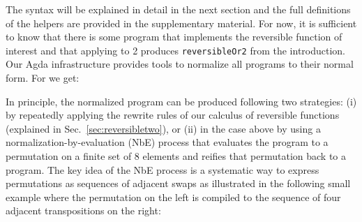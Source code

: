 \resettwo{}

\noindent The syntax will be explained in detail in the next section and the full definitions of the helpers are
provided in the supplementary material. For now, it is sufficient to know that there is some program that implements the
reversible function of interest and that applying  to 2 produces \verb|reversibleOr2| from the
introduction. Our Agda infrastructure provides tools to normalize all programs to their normal form. For 
we get:

\resetnormtwo{}

In principle, the normalized program can be produced following two strategies: (i) by repeatedly applying the rewrite
rules of our calculus of reversible functions (explained in Sec.~\ref{sec:reversibletwo}), or (ii) in the case above by
using a normalization-by-evaluation (NbE) process that evaluates the program to a permutation on a finite set of 8
elements and reifies that permutation back to a program. The key idea of the NbE process is a systematic way to express
permutations as sequences of adjacent swaps as illustrated in the following small example where the permutation on the
left is compiled to the sequence of four adjacent transpositions on the right:




